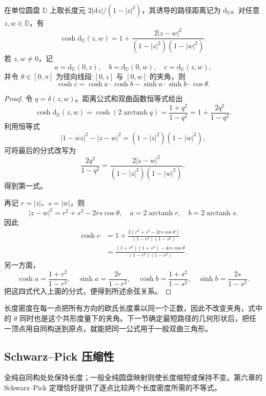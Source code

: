 \begin{proposition}[距离的双曲余弦形式]\label{b3:prop:13-cosh-distance}
在单位圆盘 \(\mathbb D\) 上取长度元 \(2|\mathrm dz|/(1-|z|^2)\)，其诱导的路径距离记为 \(\mathrm d_{\mathbb D}\)。对任意 \(z,w\in\mathbb D\)，有
\[
 \cosh\mathrm d_{\mathbb D}(z,w)
 =1+\frac{2|z-w|^2}{(1-|z|^2)(1-|w|^2)}.
\]
若 \(z,w\ne0\)，记
\[
 a=\mathrm d_{\mathbb D}(0,z),
 \quad b=\mathrm d_{\mathbb D}(0,w),
 \quad c=\mathrm d_{\mathbb D}(z,w),
\]
并令 \(\theta\in[0,\pi]\) 为径向线段 \([0,z]\) 与 \([0,w]\) 的夹角，则
\[
 \cosh c=\cosh a\cdot\cosh b
 -\sinh a\cdot\sinh b\cdot\cos\theta.
\]
\end{proposition}
\begin{proof}
令 \(q=\delta(z,w)\)。距离公式和双曲函数恒等式给出
\[
 \cosh\mathrm d_{\mathbb D}(z,w)
 =\cosh(2\operatorname{arctanh}q)
 =\frac{1+q^2}{1-q^2}
 =1+\frac{2q^2}{1-q^2}.
\]
利用恒等式
\[
 |1-\overline w z|^2-|z-w|^2
 =(1-|z|^2)(1-|w|^2),
\]
可将最后的分式改写为
\[
 \frac{2q^2}{1-q^2}
 =\frac{2|z-w|^2}{(1-|z|^2)(1-|w|^2)},
\]
得到第一式。

再记 \(r=|z|\)、\(s=|w|\)，则
\[
 |z-w|^2=r^2+s^2-2rs\cos\theta,
 \quad
 a=2\operatorname{arctanh}r,
 \quad b=2\operatorname{arctanh}s.
\]
因此
\[
 \begin{aligned}
 \cosh c
 &=1+\frac{2(r^2+s^2-2rs\cos\theta)}{(1-r^2)(1-s^2)}\\
 &=\frac{(1+r^2)(1+s^2)-4rs\cos\theta}{(1-r^2)(1-s^2)}.
 \end{aligned}
\]
另一方面，
\[
 \cosh a=\frac{1+r^2}{1-r^2},
 \quad \sinh a=\frac{2r}{1-r^2},
 \quad
 \cosh b=\frac{1+s^2}{1-s^2},
 \quad \sinh b=\frac{2s}{1-s^2}.
\]
把这四式代入上面的分式，便得到所述余弦关系。
\end{proof}

长度密度在每一点把所有方向的欧氏长度乘以同一个正数，因此不改变夹角，式中的 \(\theta\) 同时也是这个共形度量下的夹角。下一节确定最短路径的几何形状后，把任一顶点用自同构送到原点，就能把同一公式用于一般双曲三角形。

\subsection{Schwarz–Pick 压缩性}
\label{b3:subsec:130104}

全纯自同构处处保持长度；一般全纯圆盘映射则使长度缩短或保持不变。第六章的 Schwarz--Pick 定理恰好提供了逐点比较两个长度密度所需的不等式。

